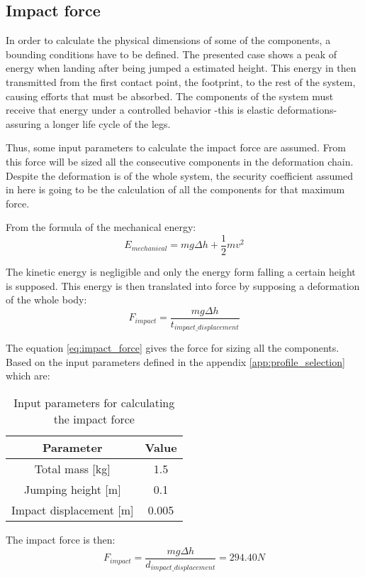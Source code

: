 \subsection{Impact force} %
\label{sub:impact_force}
In order to calculate the physical dimensions of some of the components, a bounding conditions have to be defined.
The presented case shows a peak of energy when landing after being jumped a estimated height.
This energy in then transmitted from the first contact point, the footprint, to the rest of the system, causing efforts that must be absorbed.
The components of the system must receive that energy under a controlled behavior -this is elastic deformations- assuring a longer life cycle of the legs.

Thus, some input parameters to calculate the impact force are assumed.
From this force will be sized all the consecutive components in the deformation chain.
Despite the deformation is of the whole system, the security coefficient assumed in here is going to be the calculation of all the components for that maximum force.

From the formula of the mechanical energy:
\begin{equation}
  E_{mechanical} = m g \Delta h + \frac{1}{2} m v^{2}
\end{equation}

The kinetic energy is negligible and only the energy form falling a certain height is supposed.
This energy is then translated into force by supposing a deformation of the whole body:
\begin{equation}
\label{eq:impact_force}
  F_{impact} = \frac{m g \Delta h}{t_{impact\_displacement}}
\end{equation}

The equation \ref{eq:impact_force} gives the force for sizing all the components.
Based on the input parameters defined in the appendix \ref{app:profile_selection} which are:
\begin{table}
\begin{center}
\begin{tabular}{c | c}
  Parameter & Value \\
  \hline
  Total mass [kg] & 1.5 \\
  Jumping height [m] & 0.1 \\
  Impact displacement [m] & 0.005
\end{tabular}
\caption{Input parameters for calculating the impact force}
\label{tab:input_parameter_impact_force}
\end{center}
\end{table}

The impact force is then:
\begin{equation}
  F_{impact} = \frac{m g \Delta h}{d_{impact\_displacement}} = 294.40 N 
\end{equation}
